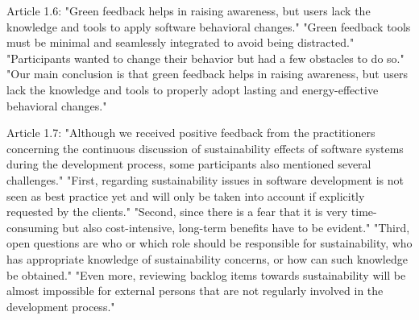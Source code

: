 \begin{itemize}
Article 1.6:
"Green feedback helps in raising awareness, but users lack the knowledge and tools to apply software behavioral changes." 
"Green feedback tools must be minimal and seamlessly integrated to avoid being distracted." 
"Participants wanted to change their behavior but had a few obstacles to do so." 
"Our main conclusion is that green feedback helps in raising awareness, but users lack the knowledge and tools to properly adopt lasting and energy-effective behavioral changes."

Article 1.7:
"Although we received positive feedback from the practitioners concerning the continuous discussion of sustainability effects of software systems during the development process, some participants also mentioned several challenges." 
"First, regarding sustainability issues in software development is not seen as best practice yet and will only be taken into account if explicitly requested by the clients." 
"Second, since there is a fear that it is very time-consuming but also cost-intensive, long-term benefits have to be evident." 
"Third, open questions are who or which role should be responsible for sustainability, who has appropriate knowledge of sustainability concerns, or how can such knowledge be obtained." 
"Even more, reviewing backlog items towards sustainability will be almost impossible for external persons that are not regularly involved in the development process."

\end{itemize}

